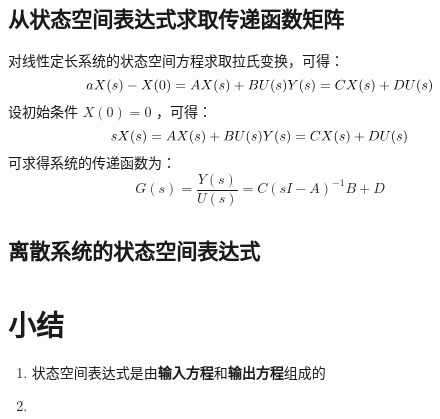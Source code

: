 \documentclass[11pt]{book}
\begin{document}
\subsection{从状态空间表达式求取传递函数矩阵}

对线性定长系统的状态空间方程求取拉氏变换，可得：
$$
aX(s) - X(0) = AX(s) + BU(s) \\
Y(s) = CX(s) + DU(s)
$$
设初始条件 $X(0) = 0$ ，可得：
$$
sX(s) = AX(s) + BU(s) \\
Y(s) = CX(s) + DU(s) 
$$
可求得系统的传递函数为：
$$
G(s) = \frac{Y(s)}{U(s)} = C (sI - A)^{-1} B + D	
$$

\subsection{离散系统的状态空间表达式}

\section{小结}

\begin{enumerate}
	\item 状态空间表达式是由\textbf{输入方程}和\textbf{输出方程}组成的
	\item \cdots
\end{enumerate}
\end{document}
